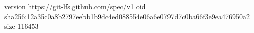 version https://git-lfs.github.com/spec/v1
oid sha256:12a35c0a8b2797eebb1b9dc4ed088554e06a6e0797d7c0ba66f3e9ea476950a2
size 116453
